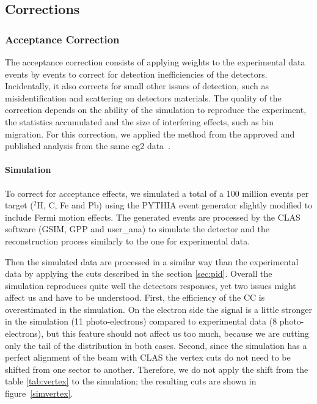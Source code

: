 \subsection{Corrections}
\label{sec:corrections}

\subsubsection{Acceptance Correction}
\label{sec:accept}

The acceptance correction consists of applying weights to the experimental data
events by events to correct for detection inefficiencies of the detectors.
Incidentally, it also corrects for small other issues of detection,
such as misidentification and scattering on detectors materials. The quality 
of the correction depends on the ability of the simulation to reproduce the 
experiment, the statistics accumulated and the size of interfering effects, such 
as bin migration. For this correction, we applied the method from the 
approved and published analysis from the same eg2 data~\cite{ElFassi:2008}.

\paragraph{Simulation}
\label{sec:simul}

To correct for acceptance effects, we simulated a total of a 100 million events 
per target ($^2$H, C, Fe and Pb) using the PYTHIA \cite{Sjostrand:2006za} 
event generator slightly modified to include Fermi motion effects. The 
generated events are processed by the CLAS software (GSIM, GPP and user\_ana) 
to simulate the detector and the reconstruction process similarly to the one for 
experimental data.

Then the simulated data are processed in a similar way than the experimental data by 
applying the cuts described in the section \ref{sec:pid}. Overall the 
simulation reproduces quite well the detectors responses, yet two issues might 
affect us and have to be understood. First, the efficiency of the CC is 
overestimated in the simulation. 
On the electron side the signal is a little stronger in the simulation (11 
photo-electrons) compared to experimental data (8 photo-electrons), but this 
feature should not affect us too much, because we are cutting only the tail of the 
distribution in both cases. 
Second, since the simulation has a perfect alignment of the beam with CLAS the 
vertex cuts do not need to be shifted from one sector to another. Therefore, 
we do not apply the shift from the table \ref{tab:vertex} to the simulation; 
the resulting cuts are shown in figure~\ref{simvertex}.

